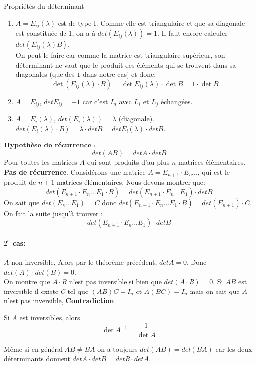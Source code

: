 \begin{parag}{Propriétés du déterminant}
\begin{preuve}
\begin{itemize}
        \end{itemize}
    \end{preuve}
    \begin{enumerate}
        \item $A = E_{ij}(\lambda)$ est de type I. Comme elle est triangulaire et que sa diagonale est constituée de 1, on a à $det(E_{ij}(\lambda)) = 1$. Il faut encore calculer $det(E_{ij}(\lambda)B)$. \\ 
        On peut le faire car comme la matrice est triangulaire supérieur, son déterminant ne vaut que le produit des éléments qui se trouvent dans sa diagonales (que des $1$ dans notre cas) et donc:
        \\ 
        \[\det(E_{ij}(\lambda)\cdot B) = \det E_{ij}(\lambda)\cdot \det B = 1 \cdot \det B\]
        \item $A = E_{ij}$, $det E_{ij} = -1$ car c'est $I_n$ avec $L_i$ et $L_j$ échangées.
        \item $A = E_i(\lambda)$, $det(E_i(\lambda)) = \lambda$ (diagonale). $det(E_i(\lambda)\cdot B) = \lambda \cdot detB = det E_{i}(\lambda)\cdot det B$.


    \end{enumerate}
    \textbf{Hypothèse de récurrence} : \[ det(AB) = det A \cdot det B\]
    Pour toutes les matrices $A$ qui sont produits d'au plus $n$ matrices élémentaires.
    \\
    \textbf{Pas de récurrence}. Considérons une matrice $A = E_{n+1} \cdot E_n ...$, qui est le produit de $n + 1$ matrices élémentaires. Nous devons montrer que:
    \[
    det(E_{n+1}\cdot E_n ... E_1 \cdot B) =  det(E_{n+1}\cdot E_n ... E_1)\cdot det B    \]
    On sait que $det( E_n ... E_1) = C$ donc $det(E_{n+1}\cdot E_n ... E_1 \cdot B) = det(E_{n+1}) \cdot C$.
    On fait la suite jusqu'à trouver : \[
    det(E_{n+1}\cdot E_n ... E_1)\cdot det B
    \]

    \paragraph{$2^{e}$ cas: } $A$ non inversible, Alors par le théorème précédent, $det A = 0$. Donc $det(A) \cdot det(B) = 0$.\\
    On montre que $A\cdot B $ n'est pas inversible si bien que $det(A\cdot B) = 0$. Si $AB$ est inversible il existe $C$ tel que $(AB)C = I_n$ et $A(BC) = I_n$ mais on sait que $A$ n'est pas inversible, \textbf{Contradiction}.
    \\
    \begin{corollaire}
       Si $A$ est inversibles, alors
       \[\det A^{-1} = \frac{1}{\det A}\]
    \end{corollaire}  
    \begin{framedremark}
        Même si en général $AB \neq BA$ on a toujours $det(AB) = det(BA)$ car les deux déterminants donnent $det A \cdot det B = det B \cdot det A$.
    \end{framedremark}
    \begin{framedremark}
        

\end{framedremark}
\end{parag}
